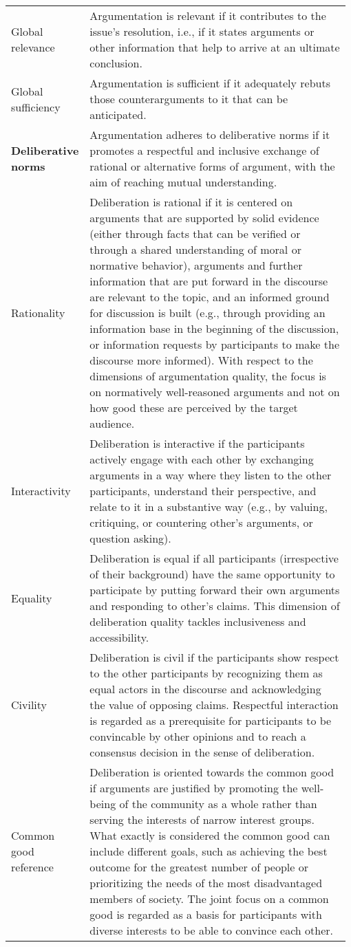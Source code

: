 \begin{table*}[ht]
\begin{tabular*}{\linewidth}{p{0.20\linewidth}p{0.78\linewidth}}
 Global relevance&Argumentation is relevant if it contributes to the issue’s resolution, i.e., if it states arguments or other information that help to arrive at an ultimate conclusion.\\
 Global sufficiency&Argumentation is sufficient if it adequately rebuts those counterarguments to it that can be anticipated.\\
\midrule
\bf Deliberative norms& Argumentation adheres to deliberative norms if it promotes a respectful and inclusive exchange of rational or alternative forms of argument, with the aim of reaching mutual understanding.\\
Rationality&Deliberation is rational if it is centered on arguments that are supported by solid evidence (either through facts that can be verified or through a shared understanding of moral or normative behavior), arguments and further information that are put forward in the discourse are relevant to the topic, and an informed ground for discussion is built (e.g., through providing an information base in the beginning of the discussion, or information requests by participants to make the discourse more informed). With respect to the dimensions of argumentation quality, the focus is on normatively well-reasoned arguments and not on how good these are perceived by the target audience.\\
 Interactivity&Deliberation is interactive if the participants actively engage with each other by exchanging arguments in a way where they listen to the other participants, understand their perspective, and relate to it in a substantive way (e.g., by valuing, critiquing, or countering other's arguments, or question asking).\\
 Equality&Deliberation is equal if all participants (irrespective of their background) have the same opportunity to participate by putting forward their own arguments and responding to other's claims. This dimension of deliberation quality tackles inclusiveness and accessibility.\\
 Civility&Deliberation is civil if the participants show respect to the other participants by recognizing them as equal actors in the discourse and acknowledging the value of opposing claims. Respectful interaction is regarded as a prerequisite for participants to be convincable by other opinions and to reach a consensus decision in the sense of deliberation.\\
 Common good reference&Deliberation is oriented towards the common good if arguments are justified by promoting the well-being of the community as a whole rather than serving the interests of narrow interest groups. What exactly is considered the common good can include different goals, such as achieving the best outcome for the greatest number of people or prioritizing the needs of the most disadvantaged members of society. The joint focus on a common good is regarded as a basis for participants with diverse interests to be able to convince each other.\\

\end{tabular*}
\end{table*}
